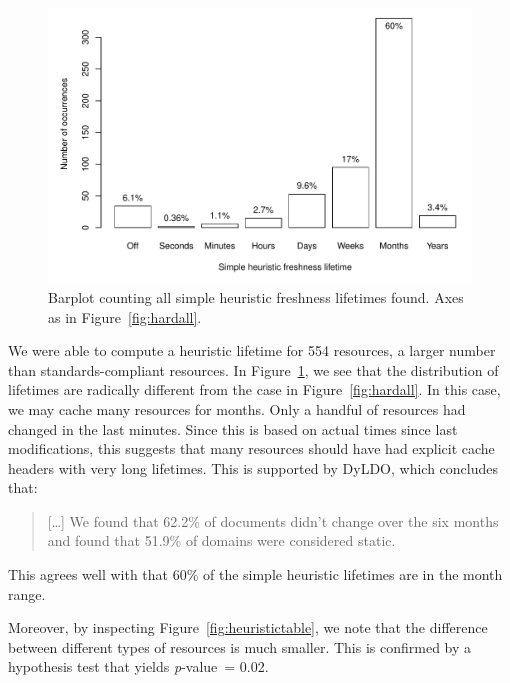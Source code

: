 \documentclass{llncs}
\newcommand{\pvalue}{\textit{p}-value\ }
\begin{document}
\begin{figure}[th!]
  \centerline{%
    \includegraphics[width=.9\textwidth]{heuristicall.pdf}}
  \caption{Barplot counting all simple heuristic freshness lifetimes
    found. Axes as in Figure~\ref{fig:hardall}.}
  \label{fig:heuristicall}
\end{figure}

We were able to compute a heuristic lifetime for 554 resources, a
larger number than standards-compliant resources. In
Figure~\ref{fig:heuristicall}, we see that the distribution of
lifetimes are radically different from the case in
Figure~\ref{fig:hardall}. In this case, we may cache many resources
for months. Only a handful of resources had changed in the last
minutes. Since this is based on actual times since last modifications,
this suggests that many resources should have had explicit cache
headers with very long lifetimes. This is supported by
DyLDO\cite{dyldo2}, which concludes that:
\begin{quote}
[\ldots] We found that 62.2\% of documents didn’t change over the six
months and found that 51.9\% of domains were considered static.
\end{quote}
This agrees well with that 60\% of the simple heuristic lifetimes are
in the month range. 

Moreover, by inspecting Figure~\ref{fig:heuristictable}, we
note that the difference between different types of resources is much
smaller. This is confirmed by a hypothesis test that yields \pvalue =
0.02.
\end{document}
